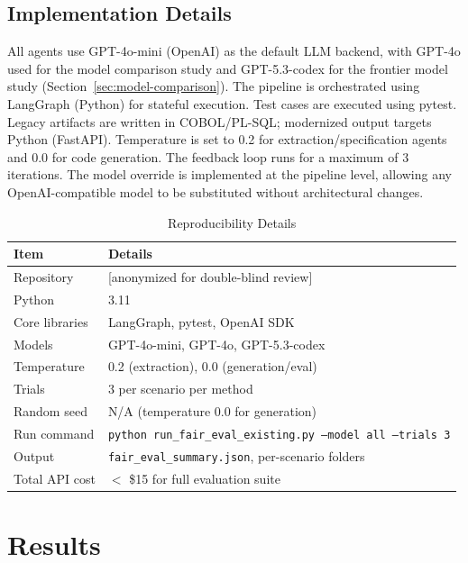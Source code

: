 \documentclass[conference]{IEEEtran}
\begin{document}
\subsection{Implementation Details}

All agents use GPT-4o-mini (OpenAI) as the default LLM backend, with GPT-4o used for the model comparison study and GPT-5.3-codex for the frontier model study (Section~\ref{sec:model-comparison}). The pipeline is orchestrated using LangGraph (Python) for stateful execution. Test cases are executed using pytest. Legacy artifacts are written in COBOL/PL-SQL; modernized output targets Python (FastAPI). Temperature is set to 0.2 for extraction/specification agents and 0.0 for code generation. The feedback loop runs for a maximum of 3 iterations. The model override is implemented at the pipeline level, allowing any OpenAI-compatible model to be substituted without architectural changes.

\begin{table}[htbp]
\caption{Reproducibility Details}
\label{tab:reproducibility}
\centering
\footnotesize
\begin{tabular}{@{}lp{6cm}@{}}
\toprule
\textbf{Item} & \textbf{Details} \\
\midrule
Repository & [anonymized for double-blind review] \\
Python & 3.11 \\
Core libraries & LangGraph, pytest, OpenAI SDK \\
Models & GPT-4o-mini, GPT-4o, GPT-5.3-codex \\
Temperature & 0.2 (extraction), 0.0 (generation/eval) \\
Trials & 3 per scenario per method \\
Random seed & N/A (temperature 0.0 for generation) \\
Run command & \texttt{python run\_fair\_eval\_existing.py --model all --trials 3} \\
Output & \texttt{fair\_eval\_summary.json}, per-scenario folders \\
Total API cost & $<$ \$15 for full evaluation suite \\
\bottomrule
\end{tabular}
\end{table}

\section{Results}
\label{sec:fair-eval}
\end{document}
